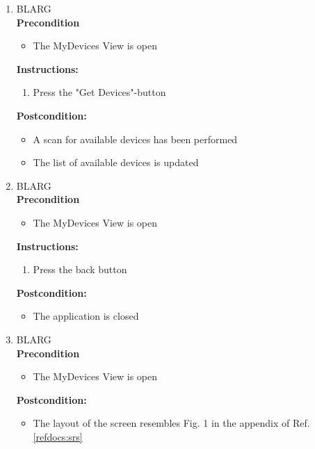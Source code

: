 \documentclass[a4paper]{article}
\newlength{\testlabellength}
\newenvironment{testlist}{\begin{enumerate}[label=\bfseries Instruction \thesubsection.\arabic* , labelindent=0pt, labelwidth=\testlabellength , leftmargin=2cm]}{\end{enumerate}}
\newenvironment{precondition}{
{\color{white}BLARG}\\ 
\textbf{Precondition}
\begin{itemize}[labelindent=0cm, labelwidth=2cm , leftmargin=1cm]
}
{\end{itemize}}
\newenvironment{instruction}{
\textbf{Instructions:}
\begin{enumerate}[label=\bfseries  \arabic*., labelindent=0cm, labelwidth=2cm , leftmargin=1cm]
}
{\end{enumerate}}
\newenvironment{postcondition}{
\textbf{Postcondition:}
\begin{itemize}[labelindent=0cm, labelwidth=2cm , leftmargin=1cm]
}
{\end{itemize}}
\begin{document}
\begin{appendices}
\begin{testlist}
   
	\item
		\begin{precondition}
			\item The MyDevices View is open
		\end{precondition}
		\begin{instruction}
			\item Press the "Get Devices"-button
		\end{instruction}
		\begin{postcondition}
			\item A scan for available devices has been performed
			\item The list of available devices is updated
		\end{postcondition}
		   
   
	\item
		\begin{precondition}
			\item The MyDevices View is open
		\end{precondition}
		\begin{instruction}
			\item Press the back button
		\end{instruction}
		\begin{postcondition}
			\item The application is closed
		\end{postcondition}
		   
    
    \item
		\begin{precondition}
			\item The MyDevices View is open
		\end{precondition}
		\begin{postcondition}
			\item The layout of the screen resembles Fig. 1 in the appendix of Ref. \ref{refdocs:srs}
		\end{postcondition}
		   

\end{testlist}
\end{appendices}
\end{document}
